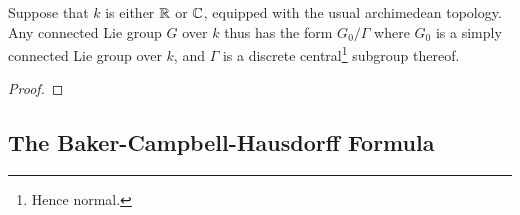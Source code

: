         \begin{proposition}
            Suppose that $k$ is either $\mathbb{R}$ or $\mathbb{C}$, equipped with the usual archimedean topology. Any connected Lie group $G$ over $k$ thus has the form $G_0/\Gamma$ where $G_0$ is a simply connected Lie group over $k$, and $\Gamma$ is a discrete central\footnote{Hence normal.} subgroup thereof.
        \end{proposition}
            \begin{proof}
                
            \end{proof}
    
    \subsection{The Baker-Campbell-Hausdorff Formula}